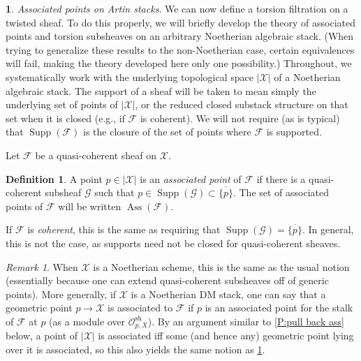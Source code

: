 \documentclass[11pt]{amsart}
\newcommand{\ms}[1]{\mathscr #1}
\newcommand{\widebar}[1]{\overline{#1}}
\DeclareMathOperator{\supp}{Supp}
\DeclareMathOperator{\ass}{Ass}
\renewcommand{\[}{[\!\hspace{0.03em}[}
\renewcommand{\]}{]\!\hspace{0.03em}]}
\renewcommand{\(}{(\!\hspace{0.03em}(}
\renewcommand{\)}{)\!\hspace{0.03em})}
\theoremstyle{definition}
\newtheorem{defn}[lem]{Definition}
\newtheorem{para}[lem]{\indent}
\theoremstyle{remark}
\newtheorem{remark}[lem]{Remark}
\newenvironment{rem}{\begin{remark}}{\nolinebreak{\hfill $\blacklozenge$} \end{remark}}
\begin{document}
\begin{para} \emph{Associated points on Artin stacks\/}.  
    We can now define a torsion 
filtration on a twisted sheaf.  To do this properly, we will briefly develop the 
theory of associated points and torsion subsheaves on an arbitrary 
Noetherian algebraic stack.  (When trying to generalize these results 
to the non-Noetherian case, certain equivalences will fail, making the 
theory developed here only one possibility.)  Throughout, we 
systematically work with the underlying topological space $|\ms X|$ of 
a Noetherian algebraic stack.  The support of a 
sheaf will be taken to mean simply the underlying set of points of 
$|\ms X|$, or the reduced closed substack structure on that set 
when it is closed (e.g., if $\ms F$ is coherent).  We will not require 
(as is typical) that $\supp(\ms F)$ is the closure of the set of 
points where $\ms F$ is supported.
\end{para}
Let $\ms F$ be a quasi-coherent sheaf on $\ms X$.
\begin{defn}\label{D:ass pt} A point $p\in|\ms X|$ is an \emph{associated point\/} 
of $\ms F$ if there is a quasi-coherent subsheaf $\ms G$ such that $p\in\supp(\ms 
G)\subset\widebar{\{p\}}$.  The set of associated points of $\ms F$ 
will be written $\ass(\ms F)$.
\end{defn}
If $\ms F$ is \emph{coherent\/}, this is the same as requiring that 
$\supp(\ms G)=\widebar{\{p\}}$.  In general, this is not the case, as 
supports need not be closed for quasi-coherent sheaves.

\begin{rem} When $\ms X$ is a Noetherian scheme, this is the same as the usual 
notion (essentially because one can extend quasi-coherent subsheaves off 
of generic points).  More generally, if $\ms X$ is a Noetherian DM stack, one can 
say that a geometric point $p\to\ms X$ is associated to $\ms F$ if $p$ 
is an associated point for the stalk of $\ms F$ at $p$ (as a module 
over ${\ms O}_{p,X}^{\text{sh}}$).  By an argument similar to \ref{P:pull 
back ass} below, a point of $|\ms X|$ is associated iff some (and hence any) geometric 
point lying over it is associated, so this also yields the same notion as 
\ref{D:ass pt}.
\end{rem}
\end{document}
